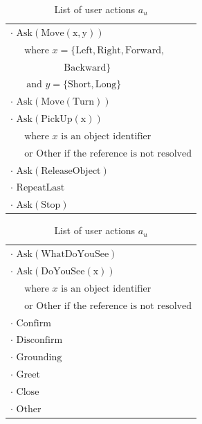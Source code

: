 \begin{table}[p!]
\begin{footnotesize}
\begin{tabular}{p{60mm}} 
$\cdot$ $\mathrm{Ask(Move(x,y))} $ \\ $ \ \ \ \ \ \text{ where } x=\{\mathrm{Left,Right,Forward,}$ \\ $\ \ \ \ \ \ \ \ \ \ \ \ \ \ \ \ \ \ \ \ \ \ \ \ \ \mathrm{Backward}\} $ \\ $ \ \ \ \ \ \ \text{ and } y = \{\mathrm{Short,Long}\}$ \\
$\cdot$ $\mathrm{Ask(Move(Turn))} $ \\
$\cdot$ $\mathrm{Ask(PickUp(x))} $ \\ $\ \ \ \ \  \text{ where } x \text{ is an object identifier}$ \\ $\ \ \ \ \  \text{ or }  \mathrm{Other} \text{ if the reference is not resolved}$ \\
$\cdot$ $\mathrm{Ask(ReleaseObject)} $ \\
$\cdot$ $\mathrm{RepeatLast}$ \\
$\cdot$ $\mathrm{Ask(Stop)}$ 
\end{tabular}
\hspace{2cm}
\begin{tabular}{p{60mm}} 
$\cdot$ $\mathrm{Ask(WhatDoYouSee)}$ \\
$\cdot$ $\mathrm{Ask(DoYouSee(x))} $ \\ $\ \ \ \ \  \text{ where } x \text{ is an object identifier }$ \\ $\ \ \ \ \  \text{ or }  \mathrm{Other} \text{ if the reference is not resolved}$ \\
$\cdot$ $\mathrm{Confirm}$ \\
$\cdot$ $\mathrm{Disconfirm}$ \\
$\cdot$ $\mathrm{Grounding}$ \\
$\cdot$ $\mathrm{Greet}$ \\
$\cdot$ $\mathrm{Close}$ \\
$\cdot$ $\mathrm{Other}$ 
\end{tabular}
\end{footnotesize}
 \caption{List of user actions $a_u$} 
\label{table:userdas_exp3}
\end{table}

